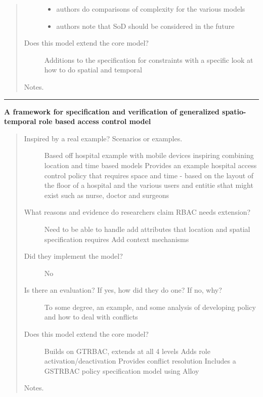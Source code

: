 \documentclass[letterpaper,10pt,english]{sphinxmanual}
\begin{document}
\begin{quote}
\begin{description}
\begin{itemize}
\item {} 
authors do comparisons of complexity for the various models

\item {} 
authors note that SoD should be considered in the future

\end{itemize}

\item[{Does this model extend the core model?}] \leavevmode
Additions to the specification for constraints with a specific look at how to do spatial and temporal

\end{description}

Notes.
\end{quote}


\bigskip\hrule{}\bigskip


\textbf{A framework for specification and verification of generalized spatio-temporal role based access control model}
\begin{quote}
\begin{description}
\item[{Inspired by a real example? Scenarios or examples.}] \leavevmode
Based off hospital example with mobile devices inspiring combining location and time based models
Provides an example hospital access control policy that requires space and time - based on the layout of the floor of a hospital and the various users and entitie sthat might exist such as nurse, doctor and surgeons

\item[{What reasons and evidence do researchers claim RBAC needs extension?}] \leavevmode
Need to be able to handle add attributes that location and spatial specification requires
Add context mechanisms

\item[{Did they implement the model?}] \leavevmode
No

\item[{Is there an evaluation? If yes, how did they do one? If no, why?}] \leavevmode
To some degree, an example, and some analysis of developing policy and how to deal with conflicts

\item[{Does this model extend the core model?}] \leavevmode
Builds on GTRBAC, extends at all 4 levels
Adds role activation/deactivation
Provides conflict resolution
Includes a GSTRBAC policy specification model using Alloy

\end{description}

Notes.
\end{quote}
\end{document}
